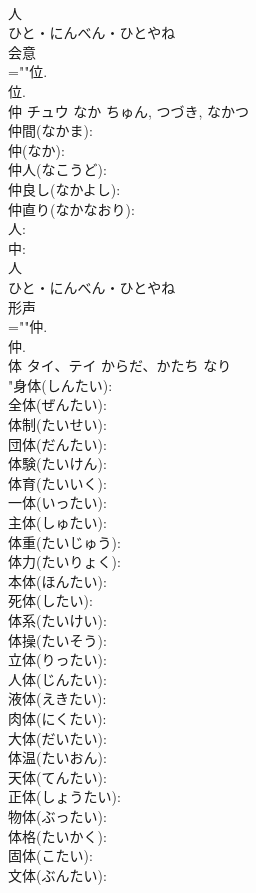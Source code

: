 \documentclass[8pt]{extreport}
\begin{document}
\begin{CJK}{UTF8}{min}
\\	人	
\\	ひと・にんべん・ひとやね	
\\	会意 
\\	=""位.
\\	位.
\\	仲	チュウ	なか	ちゅん, つづき, なかつ	
\\	仲間(なかま): 
\\	仲(なか): 
\\	仲人(なこうど): 
\\	仲良し(なかよし): 
\\	仲直り(なかなおり): 
\\	人: 
\\	中: 
\\	人	
\\	ひと・にんべん・ひとやね	
\\	形声 
\\	=""仲.
\\	仲.
\\	体	タイ、テイ	からだ、かたち	なり	
\\	"身体(しんたい): 
\\	全体(ぜんたい): 
\\	体制(たいせい): 
\\	団体(だんたい): 
\\	体験(たいけん): 
\\	体育(たいいく): 
\\	一体(いったい): 
\\	主体(しゅたい): 
\\	体重(たいじゅう): 
\\	体力(たいりょく): 
\\	本体(ほんたい): 
\\	死体(したい): 
\\	体系(たいけい): 
\\	体操(たいそう): 
\\	立体(りったい): 
\\	人体(じんたい): 
\\	液体(えきたい): 
\\	肉体(にくたい): 
\\	大体(だいたい): 
\\	体温(たいおん): 
\\	天体(てんたい): 
\\	正体(しょうたい): 
\\	物体(ぶったい): 
\\	体格(たいかく): 
\\	固体(こたい): 
\\	文体(ぶんたい): 

\end{CJK}
\end{document}

